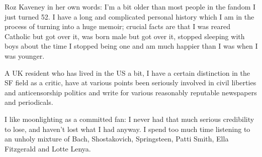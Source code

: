 {Roz Kaveney} in her own words: I'm a bit older than most people in the
fandom \textemdash{} I just turned 52. I have a long and complicated
personal history which I am in the process of turning into a huge
memoir; crucial facts are that I was reared Catholic but got over it,
was born male but got over it, stopped sleeping with boys about the
time I stopped being one and am much happier than I was when I was
younger.

A UK resident who has lived in the US a bit, I have a certain
distinction in the SF field as a critic, have at various points been
seriously involved in civil liberties and anticensorship politics and
write for various reasonably reputable newspapers and periodicals.

I like moonlighting as a committed fan: I never had that much serious
credibility to lose, and haven't lost what I had anyway. I spend too
much time listening to an unholy mixture of Bach, Shostakovich,
Springsteen, Patti Smith, Ella Fitzgerald and Lotte Lenya.

